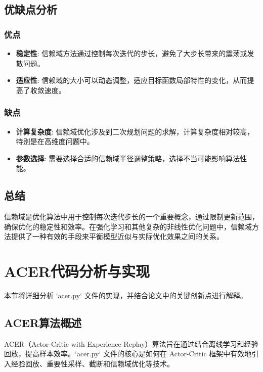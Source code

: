 \documentclass[twocolumn, 10pt]{article} %
\theoremstyle{remark}
\begin{document}
\subsection{优缺点分析}

\subsubsection{优点}

\begin{itemize}
    \item \textbf{稳定性}: 信赖域方法通过控制每次迭代的步长，避免了大步长带来的震荡或发散问题。
    \item \textbf{适应性}: 信赖域的大小可以动态调整，适应目标函数局部特性的变化，从而提高了收敛速度。
\end{itemize}

\subsubsection{缺点}

\begin{itemize}
    \item \textbf{计算复杂度}: 信赖域优化涉及到二次规划问题的求解，计算复杂度相对较高，特别是在高维度问题中。
    \item \textbf{参数选择}: 需要选择合适的信赖域半径调整策略，选择不当可能影响算法性能。
\end{itemize}

\subsection{总结}

信赖域是优化算法中用于控制每次迭代步长的一个重要概念，通过限制更新范围，确保优化的稳定性和效率。在强化学习和其他复杂的非线性优化问题中，信赖域方法提供了一种有效的手段来平衡模型近似与实际优化效果之间的关系。


\section{ACER代码分析与实现}

本节将详细分析 `acer.py` 文件的实现，并结合论文中的关键创新点进行解释。

\subsection{ACER算法概述}

ACER（Actor-Critic with Experience Replay）算法旨在通过结合离线学习和经验回放，提高样本效率。`acer.py` 文件的核心是如何在 Actor-Critic 框架中有效地引入经验回放、重要性采样、截断和信赖域优化等技术。
\end{document}
